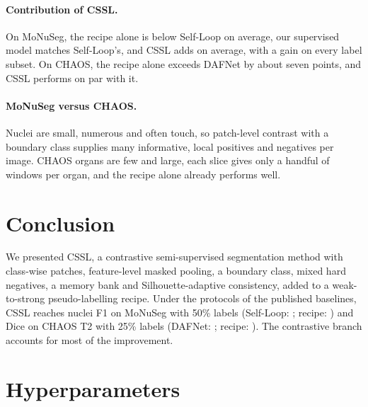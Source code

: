 \documentclass[11pt]{article}
\begin{document}
\paragraph{Contribution of CSSL.} On MoNuSeg, the recipe alone is below Self-Loop on average, our supervised model matches Self-Loop's, and CSSL adds \nMgainRecAbs{} on average, with a gain on every label subset. On CHAOS, the recipe alone exceeds DAFNet by about seven points, and CSSL performs on par with it.

\paragraph{MoNuSeg versus CHAOS.} Nuclei are small, numerous and often touch, so patch-level contrast with a boundary class supplies many informative, local positives and negatives per image. CHAOS organs are few and large, each slice gives only a handful of windows per organ, and the recipe alone already performs well.

\section{Conclusion}
\label{sec:conclusion}

We presented CSSL, a contrastive semi-supervised segmentation method with class-wise patches, feature-level masked pooling, a boundary class, mixed hard negatives, a memory bank and Silhouette-adaptive consistency, added to a weak-to-strong pseudo-labelling recipe. Under the protocols of the published baselines, CSSL reaches \nMcsslMean{} nuclei F1 on MoNuSeg with 50\% labels (Self-Loop: \nSL; recipe: \nMrecMean) and \nCcsslBMean{} Dice on CHAOS T2 with 25\% labels (DAFNet: \nDAF; recipe: \nCrecBMean). The contrastive branch accounts for most of the improvement.




\appendix
\section{Hyperparameters}
\label{app:hparams}
\end{document}
